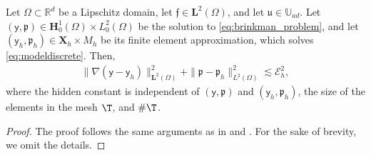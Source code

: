 \documentclass[final]{siamart0216}
\begin{document}
\begin{theorem}
\label{eq:reliability} 
Let $\Omega \subset \mathbb{R}^d$ be a Lipschitz domain, let $\boldsymbol{\mathfrak{f}}\in\mathbf{L}^2(\Omega)$, and let $\mathfrak{u}\in\mathbb{U}_{ad}$. Let $(\boldsymbol{\mathsf{y}},\mathfrak{p})\in\mathbf{H}_0^1(\Omega)\times L_0^2(\Omega)$ be the solution to \eqref{eq:brinkman_problem}, and let $(\boldsymbol{\mathsf{y}}_{h},\mathfrak{p}_{h})\in \mathbf{X}_h\times M_h$ be its finite element approximation, which solves \eqref{eq:modeldiscrete}. Then, 
\begin{eqnarray}\label{eq:bound_realiability}
\|\nabla(\boldsymbol{\mathsf{y}}-\boldsymbol{\mathsf{y}}_{h})\|_{\mathbf{L}^2(\Omega)}^2+\|\mathfrak{p}-\mathfrak{p}_{h}\|_{L^2(\Omega)}^2\lesssim \mathcal{E}_{h}^2,
\end{eqnarray}
where the hidden constant is independent of $(\boldsymbol{\mathsf{y}},\mathfrak{p})$ and $(\boldsymbol{\mathsf{y}}_{h},\mathfrak{p}_{h})$, the size of the elements in the mesh $\T$, and $\# \T$.
\end{theorem}
\begin{proof}
The proof follows the same arguments as in \cite[Section 5]{MR1259620} and \cite[Section 3]{MR1445736}. For the sake of brevity, we omit the details.
\end{proof}
%
\end{document}
